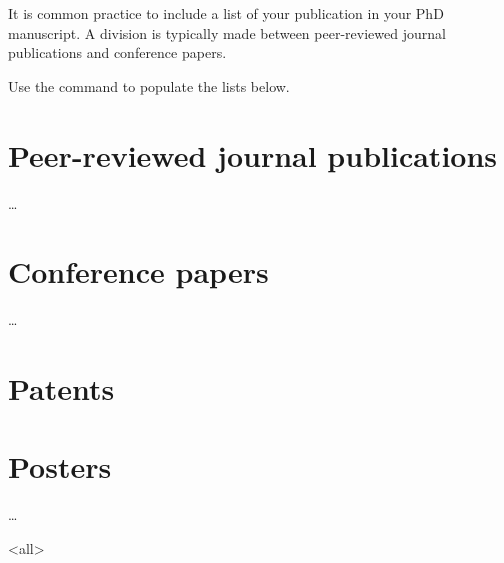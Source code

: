 \label{sec:publications}

\begin{explanation}
    It is common practice to include a list of your publication in your PhD manuscript. A division is typically made between peer-reviewed journal publications and conference papers. 

    Use the command  to populate the lists below.
\end{explanation}

\section*{Peer-reviewed journal publications}
\begin{itemshort}
    \item {} %
    \item \dots
\end{itemshort}

\section*{Conference papers}
\begin{itemshort}
    \item {} %
    \item \dots
\end{itemshort}

\section*{Patents}
\begin{itemshort}
    \item {} %
\end{itemshort}

\section*{Posters}
\begin{itemshort}
    \item \dots             %
\end{itemshort}

\mode<all> %

